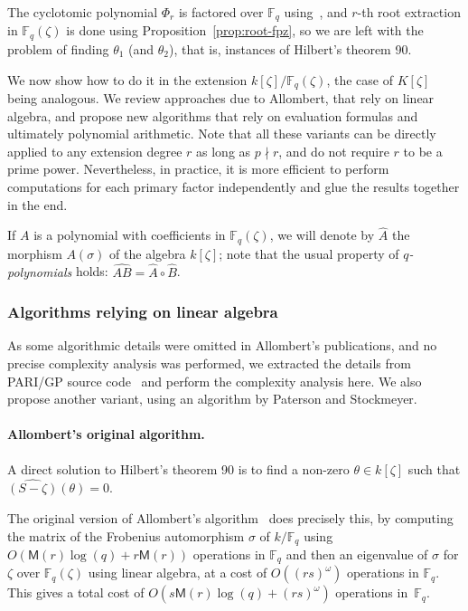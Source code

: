 \documentclass{mcom-l}
\theoremstyle{plain}
\theoremstyle{definition}
\newcommand{\F}{\ensuremath{\mathbb{F}}}
\newcommand{\MM}{\ensuremath{\mathsf{M}}}
\newcounter{algorithm}
\begin{document}

The cyclotomic polynomial $\Phi_r$ is factored over $\F_q$
using~\cite[Theorem~9]{shoup94}, and $r$-th root extraction in
$\F_q(\zeta)$ is done using Proposition~\ref{prop:root-fpz}, so we are
left with the problem of finding $\theta_1$ (and $\theta_2$), that is,
instances of Hilbert's theorem 90.  

We now show how to do it in the extension $k[\zeta]/\F_q(\zeta)$, the
case of $K[\zeta]$ being analogous. We review approaches due to
Allombert, that rely on linear algebra, and propose new algorithms
that rely on evaluation formulas and ultimately polynomial
arithmetic. Note that all these variants can be directly applied to
any extension degree $r$ as long as $p \nmid r$, and do not require $r$
to be a prime power.  Nevertheless, in practice, it is more efficient
to perform computations for each primary factor independently and glue
the results together in the end.

If $A$ is a polynomial with coefficients in $\F_q(\zeta)$, we will
denote by $\hat{A}$ the morphism $A(\sigma)$ of the algebra
$k[\zeta]$; note that the usual property of \emph{$q$-polynomials}
holds: $\widehat{AB} = \hat{A}\circ\hat{B}$.

\subsubsection{Algorithms relying on linear algebra}
\label{sec:algor-rely-line}

As some algorithmic details were omitted in Allombert's publications,
and no precise complexity analysis was performed, we extracted the
details from PARI/GP source code~\cite{Pari} and perform the complexity analysis
here.  We also propose another variant, using an algorithm by Paterson
and Stockmeyer.

\paragraph{\bf Allombert's original algorithm.}
A direct solution to Hilbert's theorem 90 is to find a non-zero
$\theta\in k[\zeta]$ such that $\widehat{(S-\zeta)}(\theta)=0$.

The original version of Allombert's algorithm~\cite{Allombert02} does
precisely this, by computing the matrix of the Frobenius automorphism
$\sigma$ of $k/\F_q$ using $O(\MM(r) \log(q) + r \MM(r))$ operations
in $\F_q$ and then an eigenvalue of $\sigma$ for $\zeta$ over
$\F_q(\zeta)$ using linear algebra, at a cost of $O((rs)^\omega)$
operations in $\F_q$. This gives a total cost of $O(s \MM(r) \log(q) +
(rs)^{\omega})$ operations in~$\F_q$.
\end{document}
